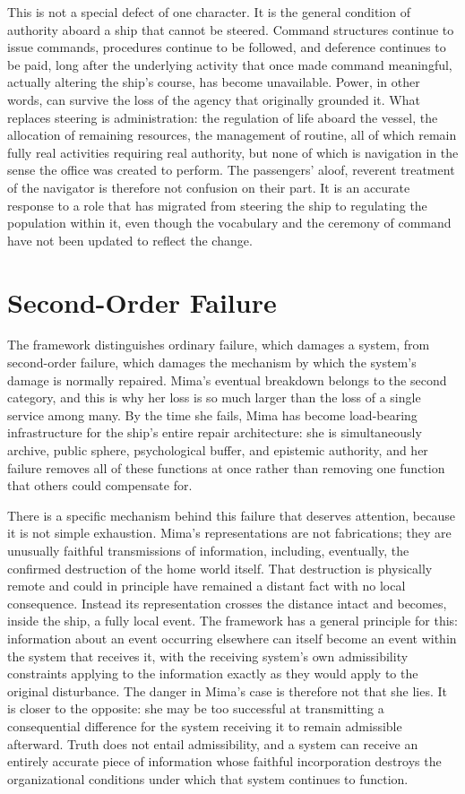 \documentclass[11pt]{article}
\begin{document}
This is not a special defect of one character. It is the general condition of authority aboard a ship that cannot be steered. Command structures continue to issue commands, procedures continue to be followed, and deference continues to be paid, long after the underlying activity that once made command meaningful, actually altering the ship's course, has become unavailable. Power, in other words, can survive the loss of the agency that originally grounded it. What replaces steering is administration: the regulation of life aboard the vessel, the allocation of remaining resources, the management of routine, all of which remain fully real activities requiring real authority, but none of which is navigation in the sense the office was created to perform. The passengers' aloof, reverent treatment of the navigator is therefore not confusion on their part. It is an accurate response to a role that has migrated from steering the ship to regulating the population within it, even though the vocabulary and the ceremony of command have not been updated to reflect the change.

\section{Second-Order Failure}

The framework distinguishes ordinary failure, which damages a system, from second-order failure, which damages the mechanism by which the system's damage is normally repaired. Mima's eventual breakdown belongs to the second category, and this is why her loss is so much larger than the loss of a single service among many. By the time she fails, Mima has become load-bearing infrastructure for the ship's entire repair architecture: she is simultaneously archive, public sphere, psychological buffer, and epistemic authority, and her failure removes all of these functions at once rather than removing one function that others could compensate for.

There is a specific mechanism behind this failure that deserves attention, because it is not simple exhaustion. Mima's representations are not fabrications; they are unusually faithful transmissions of information, including, eventually, the confirmed destruction of the home world itself. That destruction is physically remote and could in principle have remained a distant fact with no local consequence. Instead its representation crosses the distance intact and becomes, inside the ship, a fully local event. The framework has a general principle for this: information about an event occurring elsewhere can itself become an event within the system that receives it, with the receiving system's own admissibility constraints applying to the information exactly as they would apply to the original disturbance. The danger in Mima's case is therefore not that she lies. It is closer to the opposite: she may be too successful at transmitting a consequential difference for the system receiving it to remain admissible afterward. Truth does not entail admissibility, and a system can receive an entirely accurate piece of information whose faithful incorporation destroys the organizational conditions under which that system continues to function.
\end{document}
